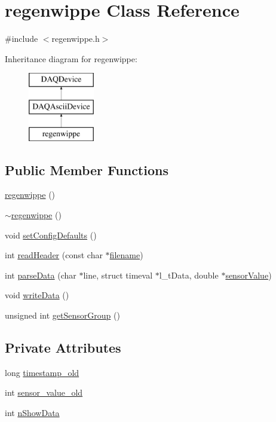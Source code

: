 \hypertarget{classregenwippe}{\section{regenwippe Class Reference}
\label{classregenwippe}
}


{\ttfamily \#include $<$regenwippe.\-h$>$}

Inheritance diagram for regenwippe\-:\begin{figure}[H]
\begin{center}
\leavevmode
\includegraphics[height=3.000000cm]{classregenwippe}
\end{center}
\end{figure}
\subsection*{Public Member Functions}
\begin{DoxyCompactItemize}
\item 
\hyperlink{classregenwippe_a4ab9263a0e0e0f1d7d61386a8d172ee7}{regenwippe} ()
\item 
\hyperlink{classregenwippe_a73c61d128cec9d072d651829e49422c8}{$\sim$regenwippe} ()
\item 
void \hyperlink{classregenwippe_ac72996d1fc607aa1764a8838d1eeb943}{set\-Config\-Defaults} ()
\item 
int \hyperlink{classregenwippe_a349ee93b85dda804304b08d6244d2cf9}{read\-Header} (const char $\ast$\hyperlink{classDAQDevice_a7f9cda7cf5b41f6b134c313477e9644b}{filename})
\item 
int \hyperlink{classregenwippe_a0975a15b95532a6c3fb7be3dda8fd4e2}{parse\-Data} (char $\ast$line, struct timeval $\ast$l\-\_\-t\-Data, double $\ast$\hyperlink{classDAQDevice_ad148188c57598fdf4fd4c1c333aeb0d8}{sensor\-Value})
\item 
void \hyperlink{classregenwippe_a8229559506073be5033662daffe76243}{write\-Data} ()
\item 
unsigned int \hyperlink{classregenwippe_ad311e91cdfbd233971f51c9a635e47ba}{get\-Sensor\-Group} ()
\end{DoxyCompactItemize}
\subsection*{Private Attributes}
\begin{DoxyCompactItemize}
\item 
long \hyperlink{classregenwippe_aae07dc7dee8d390b563878aba636a047}{timestamp\-\_\-old}
\item 
int \hyperlink{classregenwippe_a36f67a6719525a1196e7ba2a3039c116}{sensor\-\_\-value\-\_\-old}
\item 
int \hyperlink{classregenwippe_ad36d8ccd489e7f1f9599bd7edac671c4}{n\-Show\-Data}
\end{DoxyCompactItemize}
